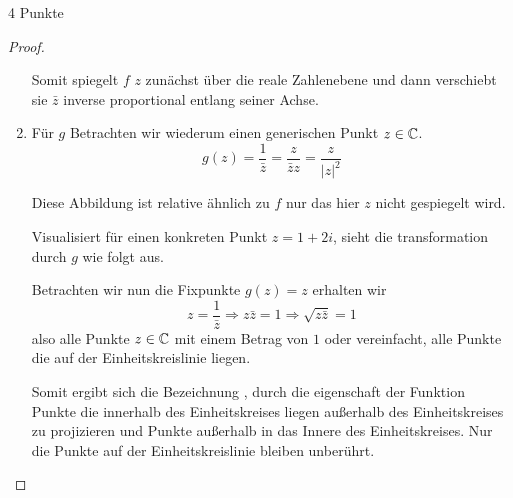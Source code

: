 \documentclass{problemset}
\begin{document}
\begin{problem}[Einheitskreis]{4 Punkte}
\begin{proof}
\begin{enumerate}
              Somit spiegelt $f$ $z$ zunächst über die reale Zahlenebene und
              dann verschiebt sie $\bar{z}$ inverse proportional entlang seiner
              Achse.

        \item Für $g$ Betrachten wir wiederum einen generischen Punkt $z \in
              \mathbb{C}$. \[
                  g(z) = \frac{1}{\bar{z}} = \frac{z}{\bar{z}z} = \frac{z}{{|z|}^2}
              \]

              Diese Abbildung ist relative ähnlich zu $f$ nur das hier $z$
              nicht gespiegelt wird.

              Visualisiert für einen konkreten Punkt $z = 1 + 2i$, sieht die
              transformation durch $g$ wie folgt aus.


              Betrachten wir nun die Fixpunkte $g(z) = z$ erhalten wir \[
                  z = \frac{1}{\bar{z}} \Rightarrow z \bar{z} = 1 \Rightarrow \sqrt{z \bar{z}} = 1
              \] also alle Punkte $z \in \mathbb{C}$ mit einem Betrag von $1$
                 oder vereinfacht, alle Punkte die auf der Einheitskreislinie
                 liegen.

              Somit ergibt sich die Bezeichnung , durch die eigenschaft der Funktion Punkte
              die innerhalb des Einheitskreises liegen außerhalb des
              Einheitskreises zu projizieren und Punkte außerhalb in das Innere
              des Einheitskreises. Nur die Punkte auf der Einheitskreislinie
              bleiben unberührt.


\end{enumerate}
\end{proof}
\end{problem}
\end{document}
